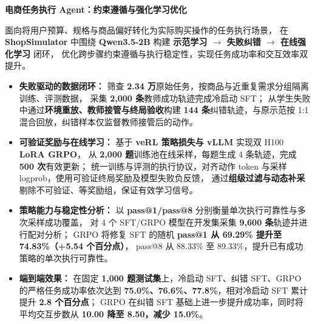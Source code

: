 \projectsubsection
{\textbf{电商任务执行 Agent：约束遵循与强化学习优化}}
{}{}

\noindent 面向将用户预算、规格与商品偏好转化为实际购买操作的任务执行场景，
在 \textbf{ShopSimulator} 中围绕 \textbf{Qwen3.5-2B} 构建
\textbf{示范学习 $\rightarrow$ 失败纠错 $\rightarrow$ 在线强化学习} 闭环，
优化跨步骤约束遵循与执行稳定性，实现任务成功率和交互效率双提升。

\begin{itemize}
  \item \textbf{失败驱动的数据闭环：}
  筛查 \textbf{2.34 万}原始任务，按商品与近重复需求分组隔离训练、评测数据，
  采集 \textbf{2,000 条}教师成功轨迹完成冷启动 SFT；
  从学生失败中通过\textbf{环境重放、教师接管与终局验收}构建
  \textbf{144 条}纠错轨迹，与原示范按 1:1 混合回放，纠错样本仅监督教师接管后的动作。

  \item \textbf{可验证奖励与在线学习：}
  基于 \textbf{veRL 策略损失与 vLLM} 实现双 H100 \textbf{LoRA GRPO}，
  从 \textbf{2,000 题}训练池在线采样，每题生成 4 条轨迹，完成 \textbf{500 次}有效更新；
  统一训练与评测的执行协议，对齐动作 token 与采样 logprob，使用可验证终局奖励及模型失败负反馈，
  通过\textbf{组级过滤与动态补采}剔除不可验证、等奖励组，保证有效学习信号。

  \item \textbf{策略能力与稳定性分析：}
  以 \textbf{pass@1/pass@8} 分别衡量单次执行可靠性与多次采样成功覆盖，
  对 4 个 SFT/GRPO 模型在开发集采集 \textbf{9,600 条}轨迹并进行配对分析；
  GRPO 将修复 SFT 的随机 \textbf{pass@1 从 69.29\% 提升至 74.83\%（+5.54 个百分点）}，
  pass@8 从 88.33\% 至 89.33\%，提升已有成功策略的单次执行可靠性。

  \item \textbf{端到端效果：}
  在固定 \textbf{1,000 题测试集}上，冷启动 SFT、纠错 SFT、GRPO 的严格任务成功率依次达到
  \textbf{75.0\%、76.6\%、77.8\%}，相对冷启动 SFT 累计提升 \textbf{2.8 个百分点}；
  GRPO 在纠错 SFT 基础上进一步提升成功率，同时将平均交互步数从
  \textbf{10.00 降至 8.50，减少 15.0\%}。
\end{itemize}
